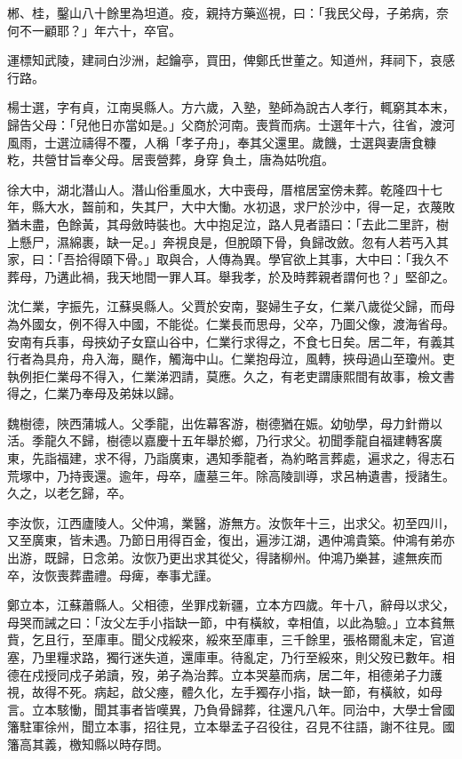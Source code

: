 \begin{pinyinscope}
郴、桂，鑿山八十餘里為坦道。疫，親持方藥巡視，曰：「我民父母，子弟病，奈何不一顧耶？」年六十，卒官。

運標知武陵，建祠白沙洲，起鑰亭，買田，俾鄭氏世董之。知道州，拜祠下，哀感行路。

楊士選，字有貞，江南吳縣人。方六歲，入塾，塾師為說古人孝行，輒窮其本末，歸告父母：「兒他日亦當如是。」父商於河南。喪貲而病。士選年十六，往省，渡河風雨，士選泣禱得不覆，人稱「孝子舟」，奉其父還里。歲饑，士選與妻唐食糠籺，共營甘旨奉父母。居喪營葬，身穿負土，唐為姑吮疽。

徐大中，湖北潛山人。潛山俗重風水，大中喪母，厝棺居室傍未葬。乾隆四十七年，縣大水，齧前和，失其尸，大中大慟。水初退，求尸於沙中，得一足，衣蔑敗猶未盡，色餘黃，其母斂時裝也。大中抱足泣，路人見者語曰：「去此二里許，樹上懸尸，濕綿裹，缺一足。」奔視良是，但脫頤下骨，負歸改斂。忽有人若丐入其家，曰：「吾拾得頤下骨。」取與合，人傳為異。學官欲上其事，大中曰：「我久不葬母，乃遘此禍，我天地間一罪人耳。舉我孝，於及時葬親者謂何也？」堅卻之。

沈仁業，字振先，江蘇吳縣人。父賈於安南，娶婦生子女，仁業八歲從父歸，而母為外國女，例不得入中國，不能從。仁業長而思母，父卒，乃圖父像，渡海省母。安南有兵事，母挾幼子女竄山谷中，仁業行求得之，不食七日矣。居二年，有義其行者為具舟，舟入海，颶作，觸海中山。仁業抱母泣，風轉，挾母過山至瓊州。吏執例拒仁業母不得入，仁業涕泗請，莫應。久之，有老吏謂康熙間有故事，檢文書得之，仁業乃奉母及弟妹以歸。

魏樹德，陜西蒲城人。父季龍，出佐幕客游，樹德猶在娠。幼劬學，母力針黹以活。季龍久不歸，樹德以嘉慶十五年舉於鄉，乃行求父。初聞季龍自福建轉客廣東，先詣福建，求不得，乃詣廣東，遇知季龍者，為約略言葬處，遍求之，得志石荒塚中，乃持喪還。逾年，母卒，廬墓三年。除高陵訓導，求呂柟遺書，授諸生。久之，以老乞歸，卒。

李汝恢，江西廬陵人。父仲鴻，業醫，游無方。汝恢年十三，出求父。初至四川，又至廣東，皆未遇。乃節日用得百金，復出，遍涉江湖，遇仲鴻貴築。仲鴻有弟亦出游，既歸，日念弟。汝恢乃更出求其從父，得諸柳州。仲鴻乃樂甚，遽無疾而卒，汝恢喪葬盡禮。母痺，奉事尤謹。

鄭立本，江蘇蕭縣人。父相德，坐罪戍新疆，立本方四歲。年十八，辭母以求父，母哭而誡之曰：「汝父左手小指缺一節，中有橫紋，幸相值，以此為驗。」立本貧無貲，乞且行，至庫車。聞父戍綏來，綏來至庫車，三千餘里，張格爾亂未定，官道塞，乃里糧求路，獨行迷失道，還庫車。待亂定，乃行至綏來，則父歿已數年。相德在戍授同戍子弟讀，歿，弟子為治葬。立本哭墓而病，居二年，相德弟子力護視，故得不死。病起，啟父瘞，體久化，左手獨存小指，缺一節，有橫紋，如母言。立本駭慟，聞其事者皆嘆異，乃負骨歸葬，往還凡八年。同治中，大學士曾國籓駐軍徐州，聞立本事，招往見，立本舉孟子召役往，召見不往語，謝不往見。國籓高其義，檄知縣以時存問。


\end{pinyinscope}
